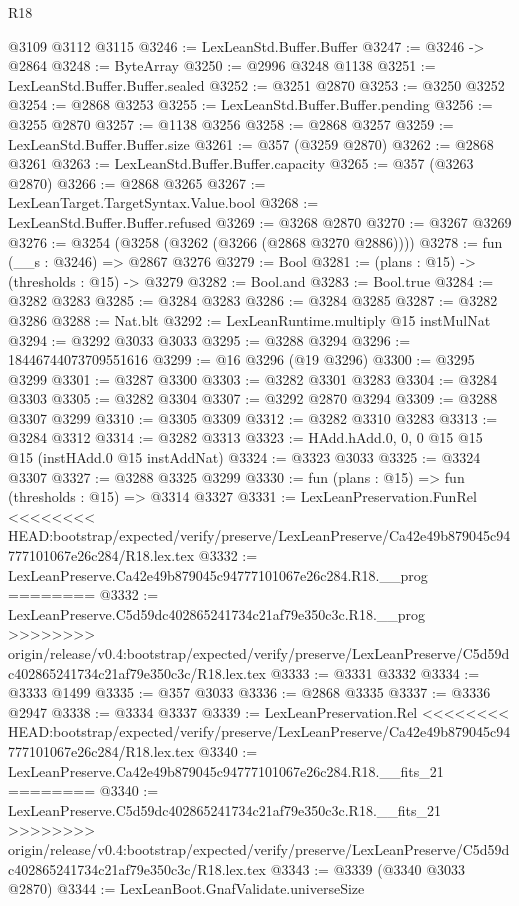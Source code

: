 \begin{lexlean}{R18}
\begin{coremodule}
{{{{{{{{{{{{{{{{{{{{{{{{{{{{{{{{{{{{{{{{{{{{{{{{{{{{{{{{{{{{{{{{{{{{{{{{{{{{{{{{{{{{{{{{{{{{{{{{{{{{{{{{{{{{{{{{{{{{{{{{{{{{{{{{{{{{{{{{{{{{{{{    @3109
    @3112
    @3115
@3246 := LexLeanStd.Buffer.Buffer
@3247 := @3246 -> @2864
@3248 := ByteArray
@3250 := @2996 @3248 @1138
@3251 := LexLeanStd.Buffer.Buffer.sealed
@3252 := @3251 @2870
@3253 := @3250 @3252
@3254 := @2868 @3253
@3255 := LexLeanStd.Buffer.Buffer.pending
@3256 := @3255 @2870
@3257 := @1138 @3256
@3258 := @2868 @3257
@3259 := LexLeanStd.Buffer.Buffer.size
@3261 := @357 (@3259 @2870)
@3262 := @2868 @3261
@3263 := LexLeanStd.Buffer.Buffer.capacity
@3265 := @357 (@3263 @2870)
@3266 := @2868 @3265
@3267 := LexLeanTarget.TargetSyntax.Value.bool
@3268 := LexLeanStd.Buffer.Buffer.refused
@3269 := @3268 @2870
@3270 := @3267 @3269
@3276 := @3254 (@3258 (@3262 (@3266 (@2868 @3270 @2886))))
@3278 := fun (__s : @3246) => @2867 @3276
@3279 := Bool
@3281 := (plans : @15) -> (thresholds : @15) -> @3279
@3282 := Bool.and
@3283 := Bool.true
@3284 := @3282 @3283
@3285 := @3284 @3283
@3286 := @3284 @3285
@3287 := @3282 @3286
@3288 := Nat.blt
@3292 := LexLeanRuntime.multiply @15 instMulNat
@3294 := @3292 @3033 @3033
@3295 := @3288 @3294
@3296 := 18446744073709551616
@3299 := @16 @3296 (@19 @3296)
@3300 := @3295 @3299
@3301 := @3287 @3300
@3303 := @3282 @3301 @3283
@3304 := @3284 @3303
@3305 := @3282 @3304
@3307 := @3292 @2870 @3294
@3309 := @3288 @3307 @3299
@3310 := @3305 @3309
@3312 := @3282 @3310 @3283
@3313 := @3284 @3312
@3314 := @3282 @3313
@3323 := HAdd.hAdd.{0, 0, 0} @15 @15 @15 (instHAdd.{0} @15 instAddNat)
@3324 := @3323 @3033
@3325 := @3324 @3307
@3327 := @3288 @3325 @3299
@3330 := fun (plans : @15) => fun (thresholds : @15) => @3314 @3327
@3331 := LexLeanPreservation.FunRel
<<<<<<<< HEAD:bootstrap/expected/verify/preserve/LexLeanPreserve/Ca42e49b879045c94777101067e26c284/R18.lex.tex
@3332 := LexLeanPreserve.Ca42e49b879045c94777101067e26c284.R18.__prog
========
@3332 := LexLeanPreserve.C5d59dc402865241734c21af79e350c3c.R18.__prog
>>>>>>>> origin/release/v0.4:bootstrap/expected/verify/preserve/LexLeanPreserve/C5d59dc402865241734c21af79e350c3c/R18.lex.tex
@3333 := @3331 @3332
@3334 := @3333 @1499
@3335 := @357 @3033
@3336 := @2868 @3335
@3337 := @3336 @2947
@3338 := @3334 @3337
@3339 := LexLeanPreservation.Rel
<<<<<<<< HEAD:bootstrap/expected/verify/preserve/LexLeanPreserve/Ca42e49b879045c94777101067e26c284/R18.lex.tex
@3340 := LexLeanPreserve.Ca42e49b879045c94777101067e26c284.R18.__fits_21
========
@3340 := LexLeanPreserve.C5d59dc402865241734c21af79e350c3c.R18.__fits_21
>>>>>>>> origin/release/v0.4:bootstrap/expected/verify/preserve/LexLeanPreserve/C5d59dc402865241734c21af79e350c3c/R18.lex.tex
@3343 := @3339 (@3340 @3033 @2870)
@3344 := LexLeanBoot.GnafValidate.universeSize
}}}}}}}}}}}}}}}}}}}}}}}}}}}}}}}}}}}}}}}}}}}}}}}}}}}}}}}}}}}}}}}}}}}}}}}}}}}}}}}}}}}}}}}}}}}}}}}}}}}}}}}}}}}}}}}}}}}}}}}}}}}}}}}}}}}}}}}}}}}}}}}
\end{coremodule}
\end{lexlean}
